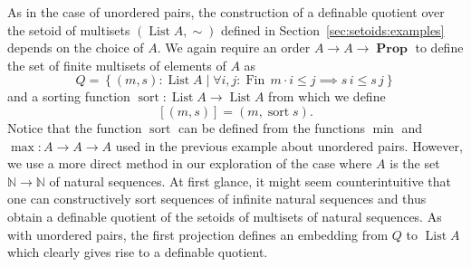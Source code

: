 \documentclass[envcountsame]{llncs}
\newcommand{\N}{\mathbb{N}}
\providecommand{\class}[1]{[#1]}
\providecommand{\set}  [1]{\left\{#1\right\}}
\DeclareMathOperator{\Prop}{\mathbf{Prop}}
\DeclareMathOperator{\List}{List}
\DeclareMathOperator{\Fin}{Fin}
\DeclareMathOperator{\sort}{sort}
\begin{document}
As in the case of unordered pairs, the construction of a definable quotient over the setoid of multisets $(\List A,\sim)$ defined in Section~\ref{sec:setoids:examples} depends on the choice of $A$.  We again require an order $A\to A \to \Prop$ to define the set of finite multisets of elements of $A$ as
\[
Q = \set{(m , s) : \List A\mid  \forall i,j:\Fin\,m \cdot i\leq j\implies s\,i \leq s\,j}
\]
and a sorting function $\sort: \List A \to \List A$ from which we define
\[
\class{(m,s)} = (m,\sort s).
\]
Notice that the function $\sort$ can be defined from the functions $\min$ and $\max : A \to A \to A$ used in the previous example about unordered pairs. However, we use a more direct method in our exploration of the case where $A$ is the set $\N\to\N$ of natural sequences. At first glance, it might seem counterintuitive that one can constructively sort sequences of infinite natural sequences and thus obtain a definable quotient of the setoids of multisets of natural sequences.
As with unordered pairs, the first projection defines an embedding from $Q$ to $\List A$ which clearly gives rise to a definable quotient.
\end{document}
